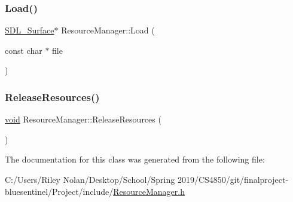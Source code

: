 \mbox{\label{class_resource_manager_ae3e0dffeb8fb5abc33d1714ecf2e8c7f}} 
\subsubsection{\texorpdfstring{Load()}{Load()}}
{\footnotesize\ttfamily \mbox{\hyperlink{struct_s_d_l___surface}{S\+D\+L\+\_\+\+Surface}}$\ast$ Resource\+Manager\+::\+Load (\begin{DoxyParamCaption}\item[{const char $\ast$}]{file }\end{DoxyParamCaption})\hspace{0.3cm}{\ttfamily [inline]}}

\mbox{\label{class_resource_manager_a9f50b131ddf3670ea40a832b532f39dc}} 
\subsubsection{\texorpdfstring{ReleaseResources()}{ReleaseResources()}}
{\footnotesize\ttfamily \mbox{\hyperlink{_s_d_l__opengles2__gl2ext_8h_ae5d8fa23ad07c48bb609509eae494c95}{void}} Resource\+Manager\+::\+Release\+Resources (\begin{DoxyParamCaption}{ }\end{DoxyParamCaption})\hspace{0.3cm}{\ttfamily [inline]}}



The documentation for this class was generated from the following file\+:\begin{DoxyCompactItemize}
\item 
C\+:/\+Users/\+Riley Nolan/\+Desktop/\+School/\+Spring 2019/\+C\+S4850/git/finalproject-\/bluesentinel/\+Project/include/\mbox{\hyperlink{_resource_manager_8h}{Resource\+Manager.\+h}}\end{DoxyCompactItemize}
